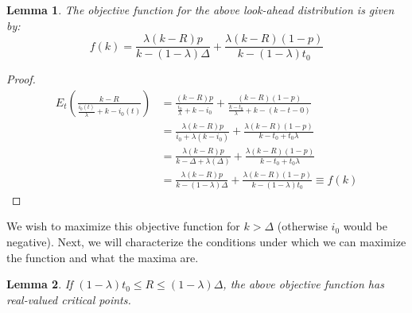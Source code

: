 \documentclass{article}
\newtheorem{lemma}{Lemma}[section]
\begin{document}
\begin{lemma}
The objective function for the above look-ahead distribution is given by:
\begin{equation*}
f(k) = \frac{\lambda (k-R)p}{k-(1-\lambda)\Delta}+\frac{\lambda (k-R)(1-p)}{k-(1-\lambda)t_0}
\end{equation*}
\end{lemma}

\begin{proof}
\begin{align*}
E_t\left(\frac{k-R}{\frac{i_0(t)}{\lambda}+k-i_0(t)} \right) &= \frac{(k-R)p}{\frac{i_0}{\lambda}+k-i_0}+\frac{(k-R)(1-p)}{\frac{k-t_0}{\lambda}+k-(k-t-0)} \\
&= \frac{\lambda(k-R)p}{i_0+\lambda(k-i_0)}+\frac{\lambda(k-R)(1-p)}{k-t_0+t_0\lambda} \\
&= \frac{\lambda(k-R)p}{k-\Delta+\lambda(\Delta)}+\frac{\lambda(k-R)(1-p)}{k-t_0+t_0\lambda} \\
&= \frac{\lambda (k-R)p}{k-(1-\lambda)\Delta}+\frac{\lambda (k-R)(1-p)}{k-(1-\lambda)t_0} \equiv f(k)
\end{align*}
\end{proof}

We wish to maximize this objective function for $k>\Delta$ (otherwise $i_0$ would be negative). Next, we will characterize the conditions under which we can maximize the function and what the maxima are.

\begin{lemma}
If $(1-\lambda)t_0 \leq R \leq (1-\lambda)\Delta$, the above objective function has real-valued critical points.
\end{lemma}
\end{document}
